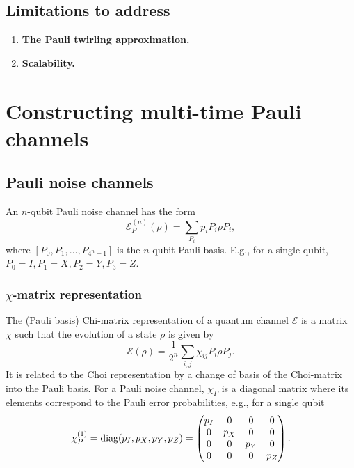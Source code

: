 \documentclass{article}
\begin{document}
\subsection{Limitations to address}
\begin{enumerate}
    \item \textbf{The Pauli twirling approximation.}

    \item \textbf{Scalability.}
\end{enumerate}

\section{Constructing multi-time Pauli channels}
\subsection{Pauli noise channels}
An $n$-qubit Pauli noise channel has the form
\begin{equation}\label{eq:pauli_channel}
    \mathcal{E}_P^{(n)}(\rho) = \sum_{P_i} p_iP_i\rho P_i,
\end{equation}
where $[P_0, P_1,\dots,P_{4^n-1}]$ is the $n$-qubit Pauli basis. E.g., for a single-qubit, $P_0=I, P_1=X, P_2=Y, P_3=Z$.

\subsubsection*{$\chi$-matrix representation}
The (Pauli basis) Chi-matrix representation of a quantum channel $\mathcal{E}$ is a matrix $\chi$ such that the evolution of a state $\rho$ is given by
\begin{equation}
    \mathcal{E}(\rho)=\frac{1}{2^n}\sum_{i,j}\chi_{ij}P_i\rho P_j.
\end{equation}
It is related to the Choi representation by a change of basis of the Choi-matrix into the Pauli basis. For a Pauli noise channel, $\chi_P$ is a diagonal matrix where its elements correspond to the Pauli error probabilities, e.g., for a single qubit
\begin{equation}
        \chi_P^{(1)} = \text{diag}(p_I, p_X, p_Y, p_Z) \\
        =
        \begin{pmatrix}
        p_I & 0 & 0 & 0\\
        0 & p_X & 0 & 0\\
        0 & 0 & p_Y & 0\\
        0 & 0 & 0 & p_Z
        \end{pmatrix}.
\end{equation}
\end{document}

